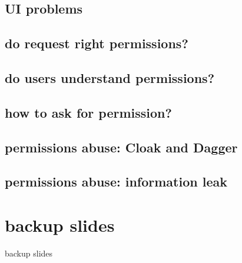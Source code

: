 \subsection{UI problems}


\subsection{do request right permissions?}


\subsection{do users understand permissions?}


\subsection{how to ask for permission?}


\subsection{permissions abuse: Cloak and Dagger}


\subsection{permissions abuse: information leak}






\section{backup slides}
\begin{frame}{backup slides}
\end{frame}

%

